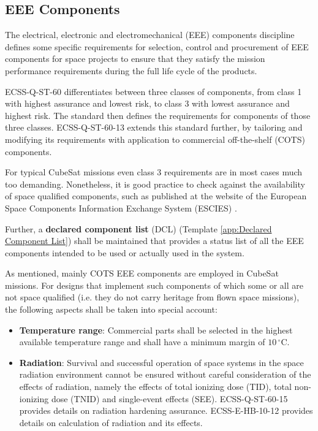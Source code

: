 \subsection{EEE Components}

The electrical, electronic and electromechanical (EEE) components discipline defines some specific requirements for selection, control and procurement of EEE components for space projects to ensure that they satisfy the mission performance requirements during the full life cycle of the products.  

ECSS-Q-ST-60 \cite{ECSS-Q-ST-60} differentiates between three classes of components, from class 1 with highest assurance and lowest risk, to class 3 with lowest assurance and highest risk. The standard then defines the requirements for components of those three classes. ECSS-Q-ST-60-13 \cite{ECSS-Q-ST-60-13} extends this standard further, by tailoring and modifying its requirements with application to commercial off-the-shelf (COTS) components. 

For typical CubeSat missions even class 3 requirements are in most cases much too demanding. Nonetheless, it is good practice to check against the availability of space qualified components, such as published at the website of the European Space Components Information Exchange System (ESCIES) \cite{escies.org}. 

Further, a \textbf{declared component list} (DCL) (Template \ref{app:Declared Component List}) shall be maintained that provides a status list of all the EEE components intended to be used or actually used in the system.

As mentioned, mainly COTS EEE components are employed in CubeSat missions. For designs that implement such components of which some or all are not space qualified (i.e. they do not carry heritage from flown space missions), the following aspects shall be taken into special account: 

\begin{itemize}
\item \textbf{Temperature range}: Commercial parts shall be selected in the highest available temperature range and shall have a minimum margin of $10\,^{\circ}\mathrm{C}$.
\item \textbf{Radiation}: Survival and successful operation of space systems in the space radiation environment cannot be ensured without careful consideration of the effects of radiation, namely the effects of total ionizing dose (TID), total non-ionizing dose (TNID) and single-event effects (SEE). ECSS-Q-ST-60-15 \cite{ECSS-Q-ST-60-15} provides details on radiation hardening assurance. ECSS-E-HB-10-12 \cite{ECSS-E-HB-10-12} provides details on calculation of radiation and its effects.
\end{itemize}

